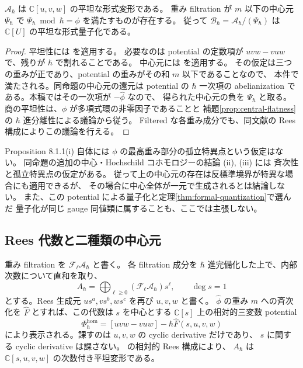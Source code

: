\begin{proposition}
\label{prop:eg-potential}
$\mathcal A_\hbar$ は $\mathbb C[u,v,w]$ の平坦な形式変形である。
重み filtration が $m$ 以下の中心元 $\Psi_\hbar$ で
$\Psi_\hbar\bmod\hbar=\phi$ を満たすものが存在する。
従って $\mathcal B_\hbar=\mathcal A_\hbar/(\Psi_\hbar)$ は
$\mathbb C[U]$ の平坦な形式量子化である。
\end{proposition}

\begin{proof}
平坦性には \cite[Lemma 7.4.2]{EG2010} を適用する。
必要なのは potential の定数項が $uvw-vuw$ で、残りが $\hbar$ で割れることである。
中心元には \cite[Proposition 8.1.1(i)]{EG2010} を適用する。
その仮定は三つの重みが正であり、potential の重みがその和 $m$ 以下であることなので、
本件で満たされる。同命題の中心元の還元は potential の $\hbar$ 一次項の
abelianization である。本稿ではその一次項が $-\widehat\phi$ なので、
得られた中心元の負を $\Psi_\hbar$ と取る。
商の平坦性は、$\phi$ が多項式環の非零因子であることと
補題\ref{prop:central-flatness}の $\hbar$ 進分離性による議論から従う。
Filtered な各重み成分でも、同文献の Rees 構成によりこの議論を行える。
\end{proof}

\begin{remark}
Proposition 8.1.1(i) 自体には $\phi$ の最高重み部分の孤立特異点という仮定はない。
同命題の追加の中心・Hochschild コホモロジーの結論 (ii), (iii) には
斉次性と孤立特異点の仮定がある。
従って上の中心元の存在は反標準境界が特異な場合にも適用できるが、
その場合に中心全体が一元で生成されるとは結論しない。
また、この potential による量子化と定理\ref{thm:formal-quantization}で選んだ
量子化が同じ gauge 同値類に属することも、ここでは主張しない。
\end{remark}

\subsection{Rees 代数と二種類の中心元}

重み filtration を $\mathcal F_\ell\mathcal A_\hbar$ と書く。
各 filtration 成分を $\hbar$ 進完備化した上で、内部次数について直和を取り、
\begin{equation}
 A_\hbar=\bigoplus_{\ell\geq0}
       (\mathcal F_\ell\mathcal A_\hbar)s^\ell,
 \qquad\deg s=1
 \label{eq:rees-algebra}
\end{equation}
とする。Rees 生成元 $us^a,vs^b,ws^c$ を再び $u,v,w$ と書く。
$\widehat\phi$ の重み $m$ への斉次化を $\widehat F$ とすれば、この代数は
$s$ を中心とする $\mathbb C[s]$ 上の相対的三変数 potential
\[
 \Phi^{\mathrm{hom}}_\hbar=[uvw-vuw]-\hbar\widehat F(s,u,v,w)
\]
により表示される。課すのは $u,v,w$ の cyclic derivative だけであり、
$s$ に関する cyclic derivative は課さない。
\cite[Proposition 8.1.1(i) の証明、pp.~1407--1408]{EG2010}の相対的 Rees 構成により、
$A_\hbar$ は $\mathbb C[s,u,v,w]$ の次数付き平坦変形である。

